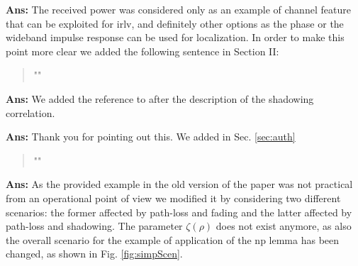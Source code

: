 \documentclass[draftcls,onecolumn,12pt]{IEEEtran}
\newcounter{revc}
\newcommand{\revp}[1]{\zref[revcontent]{#1}}
\begin{document}
{
{\bf Ans:} The received power was considered only as an example of channel feature that can be exploited for \ac{irlv}, and definitely other options as the phase or the wideband impulse response can be used for localization. In order to make this point more clear we added the following sentence in Section II:
\begin{quote}
    "\revp{revPHASE}"
\end{quote}



\vspace{5mm} %
\begin{framed}
\end{framed}

{\bf Ans:} We added the reference to \cite[Chapter 2.7]{goldsmith2005} after the description of the shadowing correlation.

\vspace{5mm} %
\begin{framed}
\end{framed}

{\bf Ans:} Thank you for pointing out this. We added in Sec. \ref{sec:auth}
\begin{quote}
"\revp{lambda}"
\end{quote}

\vspace{5mm} %
\begin{framed}
\end{framed}

{\bf Ans:} As the provided example in the old version of the paper was not practical from an operational point of view we modified it by considering two different scenarios: the former affected by path-loss and fading and the latter affected by path-loss and shadowing. The parameter $\zeta(\rho)$ does not exist anymore, as also the overall scenario for the example of application of the \ac{np} lemma has been changed, as shown in Fig. \ref{fig:simpScen}. 

\vspace{5mm} %
\begin{framed}
\end{framed}

}
\end{document}
